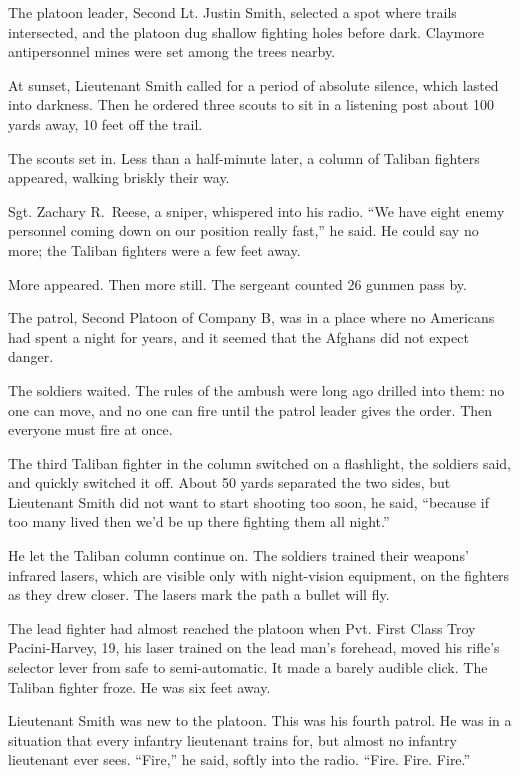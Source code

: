 \documentclass[12pt,a4paper,onecolumn]{article}
\begin{document}
The platoon leader, Second Lt. Justin Smith, selected a spot where trails intersected, and the
platoon dug shallow fighting holes before dark. Claymore antipersonnel mines were set among the
trees nearby.

At sunset, Lieutenant Smith called for a period of absolute silence, which lasted into darkness.
Then he ordered three scouts to sit in a listening post about 100 yards away, 10 feet off the trail.

The scouts set in. Less than a half-minute later, a column of Taliban fighters appeared, walking
briskly their way.

Sgt. Zachary R.~Reese, a sniper, whispered into his radio. ``We have eight enemy personnel coming
down on our position really fast,'' he said. He could say no more; the Taliban fighters were a few
feet away.

More appeared. Then more still. The sergeant counted 26 gunmen pass by.

The patrol, Second Platoon of Company B, was in a place where no Americans had spent a night for
years, and it seemed that the Afghans did not expect danger.

The soldiers waited. The rules of the ambush were long ago drilled into them: no one can move, and
no one can fire until the patrol leader gives the order. Then everyone must fire at once.

The third Taliban fighter in the column switched on a flashlight, the soldiers said, and quickly
switched it off. About 50 yards separated the two sides, but Lieutenant Smith did not want to start
shooting too soon, he said, ``because if too many lived then we'd be up there fighting them all
night.''

He let the Taliban column continue on. The soldiers trained their weapons' infrared lasers, which
are visible only with night-vision equipment, on the fighters as they drew closer. The lasers mark
the path a bullet will fly.

The lead fighter had almost reached the platoon when Pvt. First Class Troy Pacini-Harvey, 19, his
laser trained on the lead man's forehead, moved his rifle's selector lever from safe to
semi-automatic. It made a barely audible click. The Taliban fighter froze. He was six feet away.

Lieutenant Smith was new to the platoon. This was his fourth patrol. He was in a situation that
every infantry lieutenant trains for, but almost no infantry lieutenant ever sees. ``Fire,'' he
said, softly into the radio. ``Fire. Fire. Fire.''
\end{document}
